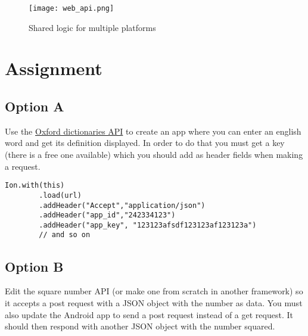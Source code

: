 \begin{figure}[H]
\centering
\texttt{[image: web\_api.png]}
\caption{Shared logic for multiple platforms}
\label{fig:logshare}
\end{figure}

\section{Assignment}

\subsection{Option A}
Use the \href{https://developer.oxforddictionaries.com}{Oxford dictionaries API} to create an app where you can enter an english word and get its definition displayed. In order to do that you must get a key (there is a free one available) which you should add as header fields when making a request.

\begin{lstlisting}[style=A_Java]
Ion.with(this)
        .load(url)
        .addHeader("Accept","application/json")
        .addHeader("app_id","242334123")
        .addHeader("app_key", "123123afsdf123123af123123a")
        // and so on
\end{lstlisting}

\subsection{Option B}
Edit the square number API (or make one from scratch in another framework) so it accepts a post request with a JSON object with the number as data. You must also update the Android app to send a post request instead of a get request. It should then respond with another JSON object with the number squared.

